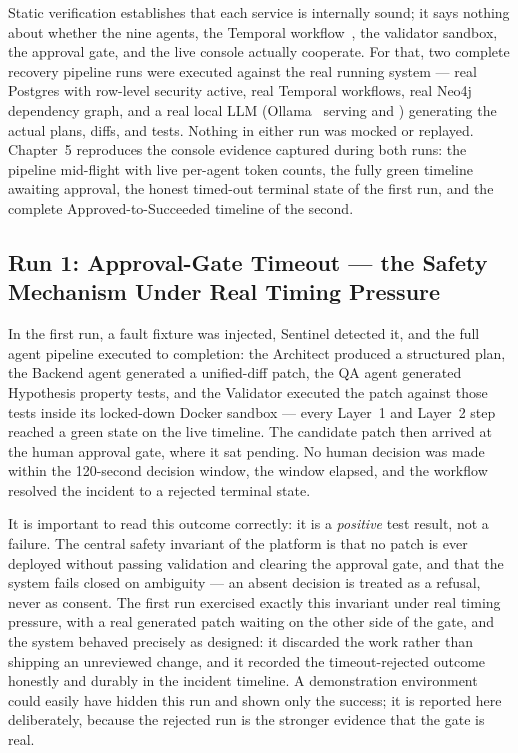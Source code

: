 Static verification establishes that each service is internally sound; it
says nothing about whether the nine agents, the Temporal
workflow~\cite{temporal}, the validator sandbox, the approval gate, and the
live console actually cooperate. For that, two complete recovery pipeline
runs were executed against the real running system --- real Postgres with
row-level security active, real Temporal workflows, real Neo4j dependency
graph, and a real local LLM (Ollama~\cite{ollama} serving
 and ) generating the actual
plans, diffs, and tests. Nothing in either run was mocked or replayed.
Chapter~5 reproduces the console evidence captured during both runs: the
pipeline mid-flight with live per-agent token counts, the fully green
timeline awaiting approval, the honest timed-out terminal state of the
first run, and the complete Approved-to-Succeeded timeline of the second.

\subsection{Run 1: Approval-Gate Timeout --- the Safety Mechanism Under Real Timing Pressure}

In the first run, a fault fixture was injected, Sentinel detected it, and
the full agent pipeline executed to completion: the Architect produced a
structured plan, the Backend agent generated a unified-diff patch, the QA
agent generated Hypothesis property tests, and the Validator executed the
patch against those tests inside its locked-down Docker sandbox --- every
Layer~1 and Layer~2 step reached a green state on the live timeline. The
candidate patch then arrived at the human approval gate, where it sat
pending. No human decision was made within the 120-second decision window,
the window elapsed, and the workflow resolved the incident to a rejected
terminal state.

It is important to read this outcome correctly: it is a \emph{positive}
test result, not a failure. The central safety invariant of the platform is
that no patch is ever deployed without passing validation and clearing the
approval gate, and that the system fails closed on ambiguity --- an absent
decision is treated as a refusal, never as consent. The first run exercised
exactly this invariant under real timing pressure, with a real generated
patch waiting on the other side of the gate, and the system behaved
precisely as designed: it discarded the work rather than shipping an
unreviewed change, and it recorded the timeout-rejected outcome honestly
and durably in the incident timeline. A demonstration environment could
easily have hidden this run and shown only the success; it is reported here
deliberately, because the rejected run is the stronger evidence that the
gate is real.


